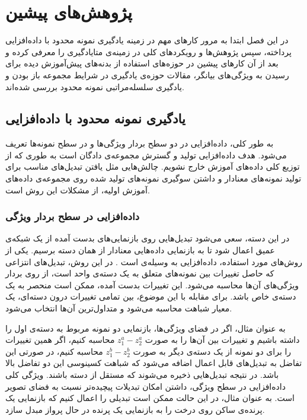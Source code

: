 \chapter{پژوهش‌های پیشین}\label{Chap:Chap2}
\minitoc
\setcounter{footnote}{0}
\pagestyle{plain}
در این فصل ابتدا به مرور کارهای مهم در زمینه یادگیری نمونه محدود با داده‌افزایی پرداخته، سپس پژوهش‌ها و رویکرد‌های کلی در زمینه‌ی متایادگیری را معرفی کرده و بعد از آن کار‌های پیشین در حوزه‌های استفاده از بدنه‌های پیش‌آموزش دیده برای رسیدن به ویژگی‌های بیانگر، مقالات حوزه‌ی یادگیری در شرایط مجموعه باز بودن و یادگیری سلسله‌مراتبی نمونه محدود بررسی شده‌اند.

\section{یادگیری نمونه محدود با داده‌افزایی}

به طور کلی، داده‌افزایی در دو سطح بردار ویژگی‌ها و در سطح نمونه‌‌ها تعریف می‌شود. هدف داده‌افزایی تولید و گسترش مجموعه‌ی دادگان است به طوری که از توزیع کلی داده‌های آموزش خارج نشویم. چالش‌هایی مثل یافتن تبدیل‌های مناسب برای تولید نمونه‌های معنادار و داشتن سوگیری نمونه‌های تولید شده روی مجموعه‌ی داده‌های آموزش اولیه، از مشکلات این روش است.

\subsection{داده‌افزایی در سطح بردار ویژگی}

در این دسته، سعی می‌شود تبدیل‌هایی روی بازنمایی‌های بدست آمده از یک شبکه‌ی عمیق اعمال شود تا به بازنمایی داده‌هایی معنادار از همان دسته برسیم. یکی از روش‌های مورد استفاده، داده‌افزایی به وسیله‌ی
 است
 \cite{Hariharan2016LowShotVR}
 .
 در این روش، تبدیل‌های انتزاعی که حاصل تغییرات بین نمونه‌های متعلق به یک دسته‌ی واحد است، از روی بردار ویژگی‌های آن‌ها محاسبه می‌شود. این تغییرات بدست آمده، ممکن است منحصر به یک دسته‌ی خاص باشد. برای مقابله با این موضوع، بین تمامی تغییرات درون دسته‌ای، یک معیار شباهت محاسبه می‌شود و متداول‌ترین آن‌ها انتخاب می‌شود. 
 
 به عنوان مثال، اگر در فضای ویژگی‌ها، بازنمایی دو نمونه مربوط به دسته‌ی اول را داشته باشیم و تغییرات بین آن‌ها را به صورت
 $z_1^a - z_2^a$
 محاسبه کنیم، اگر همین تغییرات را برای دو نمونه از یک دسته‌ی دیگر به صورت 
  $z_1^b- z_2^b$
  محاسبه کنیم، در صورتی این تفاضل به تبدیل‌های قابل اعمال اضافه می‌شود که شباهت کسینوسی این دو تفاضل بالا باشد. در نتیجه تبدیل‌هایی ذخیره می‌شوند که مستقل از دسته باشند. ویژگی کلی داده‌افزایی در سطح ویژگی، داشتن امکان تبدیلات پیچیده‌تر نسبت به فضای تصویر است. به عنوان مثال، در این حالت ممکن است تبدیلی را اعمال کنیم که بازنمایی یک پرنده‌ی ساکن روی درخت را به بازنمایی یک پرنده در حال پرواز مبدل سازد.
  
